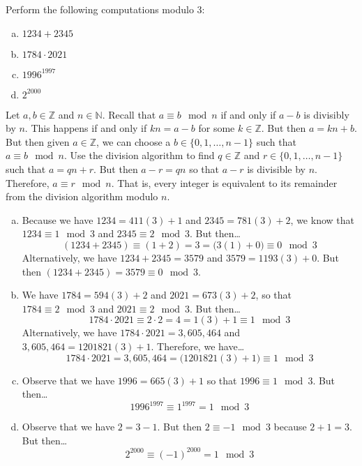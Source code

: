 \documentclass[11pt,letterpaper]{article}
\begin{document}

 Perform the following computations modulo 3:
\begin{enumerate}[(a)]
\item $1234 + 2345$
\item $1784 \cdot 2021$ 
\item $1996^{1997}$
\item $2^{2000}$
\end{enumerate} \pspace

\sol Let $a, b \in \mathbb{Z}$ and $n \in \mathbb{N}$. Recall that $a \equiv b \mod n$ if and only if $a - b$ is divisibly by $n$. This happens if and only if $kn= a - b$ for some $k \in \mathbb{Z}$. But then $a= kn + b$. But then given $a \in \mathbb{Z}$, we can choose a $b \in \{ 0, 1, \ldots, n - 1 \}$ such that $a \equiv b \mod n$. Use the division algorithm to find $q \in \mathbb{Z}$ and $r \in \{ 0, 1, \ldots, n - 1 \}$ such that $a= qn + r$. But then $a - r= qn$ so that $a - r$ is divisible by $n$. Therefore, $a \equiv r \mod n$. That is, every integer is equivalent to its remainder from the division algorithm modulo $n$. 

\begin{enumerate}[(a)]
\item Because we have $1234= 411(3) + 1$ and $2345= 781(3) + 2$, we know that $1234 \equiv 1 \mod 3$ and $2345 \equiv 2 \mod 3$. But then\dots
	\[
	(1234 + 2345) \equiv (1 + 2)= 3 = \big(3(1) + 0 \big) \equiv 0 \mod 3
	\]
Alternatively, we have $1234 + 2345= 3579$ and $3579= 1193(3) + 0$. But then $(1234 + 2345)= 3579 \equiv 0 \mod 3$. \pspace

\item We have $1784= 594(3) + 2$ and $2021= 673(3) + 2$, so that $1784 \equiv 2 \mod 3$ and $2021 \equiv 2 \mod 3$. But then\dots
	\[
	1784 \cdot 2021 \equiv 2 \cdot 2 = 4 = 1(3) + 1 \equiv 1 \mod 3
	\]
Alternatively, we have $1784 \cdot 2021= 3,\!605,\!464$ and $3,\!605,\!464= 1201821(3) + 1$. Therefore, we have\dots
	\[
	1784 \cdot 2021= 3,\!605,\!464 = \big(1201821(3) + 1 \big) \equiv 1 \mod 3
	\] \pspace

\item Observe that we have $1996= 665(3) + 1$ so that $1996 \equiv 1 \mod 3$. But then\dots
	\[
	1996^{1997} \equiv 1^{1997} = 1 \mod 3
	\] \pspace

\item Observe that we have $2= 3 - 1$. But then $2 \equiv -1 \mod 3$ because $2 + 1= 3$. But then\dots
	\[
	2^{2000} \equiv (-1)^{2000}= 1 \mod 3
	\]
\end{enumerate}
\end{document}
